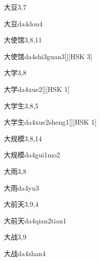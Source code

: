 \begin{entry}{大豆}{3,7}
  \begin{phonetics}{大豆}{da4dou4}
  \end{phonetics}
\end{entry}

\begin{entry}{大使馆}{3,8,11}
  \begin{phonetics}{大使馆}{da4shi3guan3}[][HSK 3]
  \end{phonetics}
\end{entry}

\begin{entry}{大学}{3,8}
  \begin{phonetics}{大学}{da4xue2}[][HSK 1]
  \end{phonetics}
\end{entry}

\begin{entry}{大学生}{3,8,5}
  \begin{phonetics}{大学生}{da4xue2sheng1}[][HSK 1]
  \end{phonetics}
\end{entry}

\begin{entry}{大规模}{3,8,14}
  \begin{phonetics}{大规模}{da4gui1mo2}
  \end{phonetics}
\end{entry}

\begin{entry}{大雨}{3,8}
  \begin{phonetics}{大雨}{da4yu3}
  \end{phonetics}
\end{entry}

\begin{entry}{大前天}{3,9,4}
  \begin{phonetics}{大前天}{da4qian2tian1}
  \end{phonetics}
\end{entry}

\begin{entry}{大战}{3,9}
  \begin{phonetics}{大战}{da4zhan4}
  \end{phonetics}
\end{entry}

